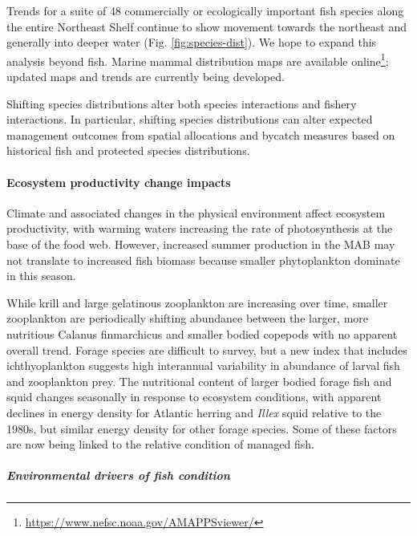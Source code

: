 \documentclass[
  10pt,
]{article}
\begin{document}
Trends for a suite of 48 commercially or ecologically important fish
species along the entire Northeast Shelf continue to show movement
towards the northeast and generally into deeper water (Fig.
\ref{fig:species-dist}). We hope to expand this analysis beyond fish.
Marine mammal distribution maps are available online\footnote{\url{https://www.nefsc.noaa.gov/AMAPPSviewer/}};
updated maps and trends are currently being developed.

Shifting species distributions alter both species interactions and
fishery interactions. In particular, shifting species distributions can
alter expected management outcomes from spatial allocations and bycatch
measures based on historical fish and protected species distributions.

\hypertarget{ecosystem-productivity-change-impacts}{%
\paragraph{Ecosystem productivity change
impacts}\label{ecosystem-productivity-change-impacts}}

Climate and associated changes in the physical environment affect
ecosystem productivity, with warming waters increasing the rate of
photosynthesis at the base of the food web. However, increased summer
production in the MAB may not translate to increased fish biomass
because smaller phytoplankton dominate in this season.

While krill and large gelatinous zooplankton are increasing over time,
smaller zooplankton are periodically shifting abundance between the
larger, more nutritious Calanus finmarchicus and smaller bodied copepods
with no apparent overall trend. Forage species are difficult to survey,
but a new index that includes ichthyoplankton suggests high interannual
variability in abundance of larval fish and zooplankton prey. The
nutritional content of larger bodied forage fish and squid changes
seasonally in response to ecosystem conditions, with apparent declines
in energy density for Atlantic herring and \emph{Illex} squid relative
to the 1980s, but similar energy density for other forage species. Some
of these factors are now being linked to the relative condition of
managed fish.

\hypertarget{environmental-drivers-of-fish-condition}{%
\subparagraph{\texorpdfstring{\emph{Environmental drivers of fish
condition}}{Environmental drivers of fish condition}}\label{environmental-drivers-of-fish-condition}}
\end{document}
